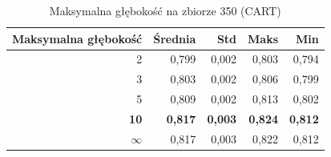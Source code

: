 \begin{table}[htbp]
\centering
\small
\setlength{\tabcolsep}{6pt}
\renewcommand{\arraystretch}{1.2}
\caption{Maksymalna głębokość na zbiorze 350 (CART)}
\label{tab:CART_max_depth_350}
\begin{tabular}{r|r|r|r|r}
\toprule
Maksymalna głębokość & Średnia & Std & Maks & Min \\
\hline
2 & 0,799 & 0,002 & 0,803 & 0,794 \\
3 & 0,803 & 0,002 & 0,806 & 0,799 \\
5 & 0,809 & 0,002 & 0,813 & 0,802 \\
\textbf{10} & \textbf{0,817} & \textbf{0,003} & \textbf{0,824} & \textbf{0,812} \\
$\infty$ & 0,817 & 0,003 & 0,822 & 0,812 \\
\bottomrule
\end{tabular}
\end{table}
